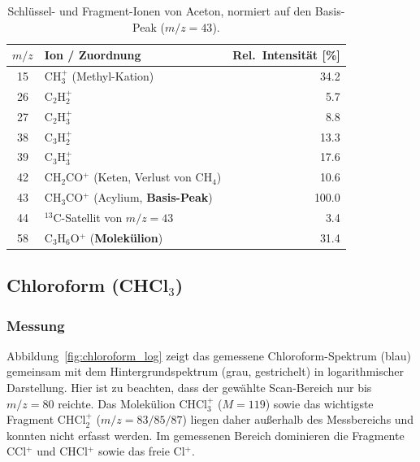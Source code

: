 \documentclass{article}
\begin{document}
\begin{table}[htbp]
    \centering
    \caption{Schlüssel- und Fragment-Ionen von Aceton, normiert auf den
        Basis-Peak ($m/z = 43$).}
    \label{tab:aceton}
    \begin{tabular}{c l r}
        \toprule
        $m/z$ & Ion / Zuordnung & Rel.\ Intensität [\%] \\
        \midrule
        15 & CH$_3^+$ (Methyl-Kation)                       &  34.2 \\
        26 & C$_2$H$_2^+$                                    &   5.7 \\
        27 & C$_2$H$_3^+$                                    &   8.8 \\
        38 & C$_3$H$_2^+$                                    &  13.3 \\
        39 & C$_3$H$_3^+$                                    &  17.6 \\
        42 & CH$_2$CO$^+$ (Keten, Verlust von CH$_4$)        &  10.6 \\
        43 & CH$_3$CO$^+$ (Acylium, \textbf{Basis-Peak})     & 100.0 \\
        44 & $^{13}$C-Satellit von $m/z = 43$                &   3.4 \\
        58 & C$_3$H$_6$O$^+$ (\textbf{Molekülion})           &  31.4 \\
        \bottomrule
    \end{tabular}
\end{table}

\subsection{Chloroform (CHCl$_3$)}

\subsubsection*{Messung}

Abbildung~\ref{fig:chloroform_log} zeigt das gemessene
Chloroform-Spektrum (blau) gemeinsam mit dem Hintergrundspektrum (grau,
gestrichelt) in logarithmischer Darstellung.
Hier ist zu beachten, dass der gewählte Scan-Bereich nur bis
$m/z = 80$ reichte. Das Molekülion CHCl$_3^+$ ($M = 119$) sowie das
wichtigste Fragment CHCl$_2^+$ ($m/z = 83/85/87$) liegen daher
außerhalb des Messbereichs und konnten nicht erfasst werden.
Im gemessenen Bereich dominieren die Fragmente CCl$^+$ und CHCl$^+$
sowie das freie Cl$^+$.
\end{document}
